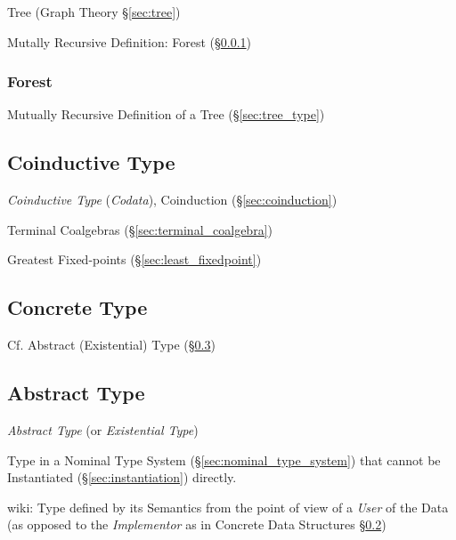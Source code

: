 Tree (Graph Theory \S\ref{sec:tree})

Mutally Recursive Definition: Forest (\S\ref{sec:forest_type})



\subsubsection{Forest}\label{sec:forest_type}

Mutually Recursive Definition of a Tree (\S\ref{sec:tree_type})



\subsection{Coinductive Type}\label{sec:coinductive_type}

\emph{Coinductive Type} (\emph{Codata}), Coinduction
(\S\ref{sec:coinduction})

Terminal Coalgebras (\S\ref{sec:terminal_coalgebra})

Greatest Fixed-points (\S\ref{sec:least_fixedpoint})



\subsection{Concrete Type}\label{sec:concrete_type}

\fist Cf. Abstract (Existential) Type (\S\ref{sec:abstract_type})



\subsection{Abstract Type}\label{sec:abstract_type}

\emph{Abstract Type} (or \emph{Existential Type})

Type in a Nominal Type System (\S\ref{sec:nominal_type_system}) that
cannot be Instantiated (\S\ref{sec:instantiation}) directly.

wiki: Type defined by its Semantics from the point of view of a
\emph{User} of the Data (as opposed to the \emph{Implementor} as in
Concrete Data Structures \S\ref{sec:concrete_type})

